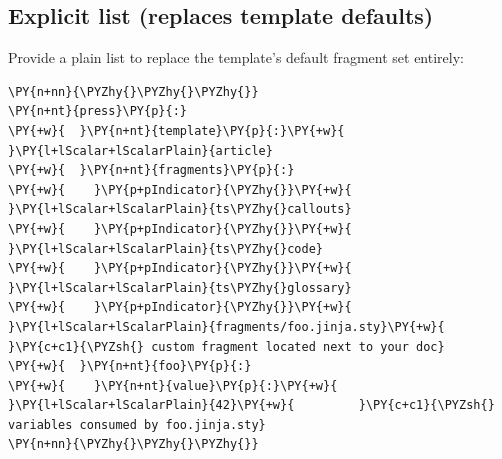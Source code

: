 \documentclass[a4paper,twoside]{article}
\begin{document}
\subsection{Explicit list (replaces template defaults)}
Provide a plain list to replace the template's default fragment set entirely:
\begin{tscode}[lang=yaml, engine=pygments]
\begin{Verbatim}[commandchars=\\\{\},breaklines, breakanywhere, commandchars=\\\{\}]
\PY{n+nn}{\PYZhy{}\PYZhy{}\PYZhy{}}
\PY{n+nt}{press}\PY{p}{:}
\PY{+w}{  }\PY{n+nt}{template}\PY{p}{:}\PY{+w}{ }\PY{l+lScalar+lScalarPlain}{article}
\PY{+w}{  }\PY{n+nt}{fragments}\PY{p}{:}
\PY{+w}{    }\PY{p+pIndicator}{\PYZhy{}}\PY{+w}{ }\PY{l+lScalar+lScalarPlain}{ts\PYZhy{}callouts}
\PY{+w}{    }\PY{p+pIndicator}{\PYZhy{}}\PY{+w}{ }\PY{l+lScalar+lScalarPlain}{ts\PYZhy{}code}
\PY{+w}{    }\PY{p+pIndicator}{\PYZhy{}}\PY{+w}{ }\PY{l+lScalar+lScalarPlain}{ts\PYZhy{}glossary}
\PY{+w}{    }\PY{p+pIndicator}{\PYZhy{}}\PY{+w}{ }\PY{l+lScalar+lScalarPlain}{fragments/foo.jinja.sty}\PY{+w}{  }\PY{c+c1}{\PYZsh{} custom fragment located next to your doc}
\PY{+w}{  }\PY{n+nt}{foo}\PY{p}{:}
\PY{+w}{    }\PY{n+nt}{value}\PY{p}{:}\PY{+w}{ }\PY{l+lScalar+lScalarPlain}{42}\PY{+w}{         }\PY{c+c1}{\PYZsh{} variables consumed by foo.jinja.sty}
\PY{n+nn}{\PYZhy{}\PYZhy{}\PYZhy{}}
\end{Verbatim}
\end{tscode}
\end{document}
